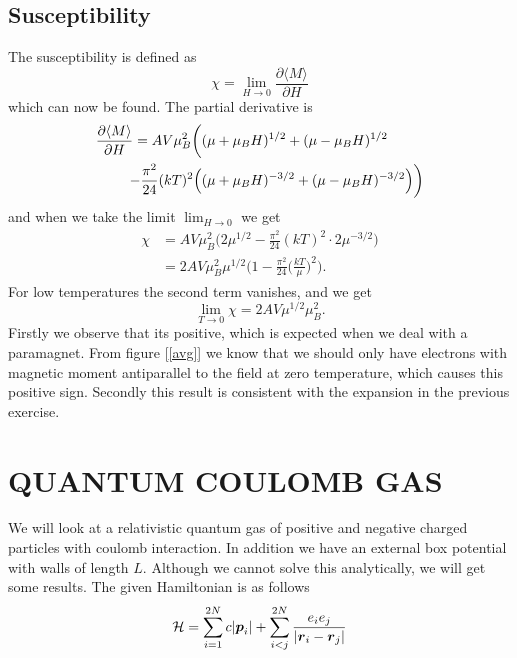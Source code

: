 \documentclass[norsk,a4paper,12pt]{article}
\begin{document}
\subsection{Susceptibility}
The susceptibility is defined as
\begin{equation}
\chi=\lim_{H\rightarrow0}\frac{\partial \langle M\rangle}{\partial H}
\end{equation}
which can now be found. The partial derivative is
\begin{align}
\frac{\partial \langle M\rangle}{\partial H}=AV\mu_B^2\bigg(&(\mu+\mu_BH)^{1/2}+(\mu-\mu_BH)^{1/2}\notag\\-\frac{\pi^2}{24}(kT)^2\Big(&(\mu+\mu_BH)^{-3/2} + (\mu-\mu_BH)^{-3/2}\Big)\bigg)
\end{align}
and when we take the limit $\lim_{H\rightarrow 0}$ we get
\begin{align}
\chi&=AV\mu_B^2\bigg(2\mu^{1/2}-\frac{\pi^2}{24}(kT)^2\cdot2\mu^{-3/2}\bigg)\\
&=2AV\mu_B^2\mu^{1/2}\bigg(1-\frac{\pi^2}{24}\Big(\frac{kT}{\mu}\Big)^2\bigg).
\end{align}
For low temperatures the second term vanishes, and we get
\begin{equation}
\lim_{T\rightarrow 0}\chi=2AV\mu^{1/2}\mu_B^2.
\end{equation}
Firstly we observe that its positive, which is expected when we deal with a paramagnet. From figure [\ref{avg}] we know that we should only have electrons with magnetic moment antiparallel to the field at zero temperature, which causes this positive sign. Secondly this result is consistent with the expansion in the previous exercise.

\newpage
\section{QUANTUM COULOMB GAS}
We will look at a relativistic quantum gas of positive and negative charged particles with coulomb interaction. In addition we have an external box potential with walls of length $L$. Although we cannot solve this analytically, we will get some results. The given Hamiltonian is as follows
\begin{equation}
{\cal H}=\sum_{i=1}^{2N}c|\boldsymbol{p}_i|+\sum_{i<j}^{2N}\frac{e_ie_j}{|\boldsymbol{r}_i - \boldsymbol{r}_j|}
\end{equation}
\end{document}
